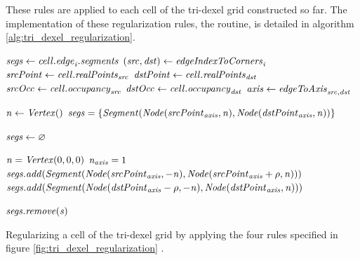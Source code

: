 These rules are applied to each cell of the tri-dexel grid constructed so far.
The implementation of these regularization rules, \ie the  routine, is detailed in algorithm \ref{alg:tri_dexel_regularization}.
%
\begin{algorithm}
	\centering
	\begin{algorithmic}[1]
				\State $\mathit{segs} \gets \mathit{cell}.\mathit{edge}_{\mathit{i}}.\mathit{segments}$ 
				\State $(\mathit{src}, \mathit{dst}) \gets \mathit{edgeIndexToCorners}_{\mathit{i}}$
				\State $\mathit{srcPoint} \gets \mathit{cell}.\mathit{realPoints}_{\mathit{src}}$
				\State $\mathit{dstPoint} \gets \mathit{cell}.\mathit{realPoints}_{\mathit{dst}}$
				\State $\mathit{srcOcc} \gets \mathit{cell}.\mathit{occupancy}_{\mathit{src}}$
				\State $\mathit{dstOcc} \gets \mathit{cell}.\mathit{occupancy}_{\mathit{dst}}$
				\State $\mathit{axis} \gets \mathit{edgeToAxis}_{\mathit{src}, \mathit{dst}}$
				
					\State $\mathit{n} \gets \mathit{Vertex}()$ 
					\State $\mathit{segs} = \{ \mathit{Segment}(\mathit{Node}(\mathit{srcPoint}_{\mathit{axis}}, \mathit{n}), \mathit{Node}(\mathit{dstPoint}_{\mathit{axis}}, \mathit{n})) \}$
				\EndIf
				
					\State $\mathit{segs} \gets \varnothing$
				\EndIf
				
				\State $\mathit{n} = \mathit{Vertex}(0, 0, 0)$
				\State $\mathit{n}_{\mathit{axis}} = 1$
						\State $\mathit{segs}.\mathit{add}(\mathit{Segment}(\mathit{Node}(\mathit{srcPoint}_{\mathit{axis}}, -\mathit{n}), \mathit{Node}(\mathit{srcPoint}_{\mathit{axis}} + \rho, \mathit{n})))$
					\EndIf
				\EndIf
						\State $\mathit{segs}.\mathit{add}(\mathit{Segment}(\mathit{Node}(\mathit{dstPoint}_{\mathit{axis}} - \rho, -\mathit{n}), \mathit{Node}(\mathit{dstPoint}_{\mathit{axis}}, \mathit{n})))$
					\EndIf
				\EndIf
				
						\State $\mathit{segs}.\mathit{remove}(\mathit{s})$
					\EndIf
				\EndFor
			\EndFor
		\EndFunction
	\end{algorithmic}
	\caption{
		Regularizing a cell of the tri-dexel grid by applying the four rules specified in figure \ref{fig:tri_dexel_regularization} \cite{tridexel_reconstruction}.
	}
	\label{alg:tri_dexel_regularization}
\end{algorithm}
